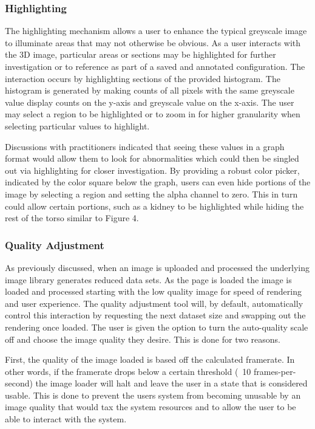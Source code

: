 \documentclass[annual]{acmsiggraph}
\begin{document}
\subsubsection{Highlighting}
	The highlighting mechanism allows a user to enhance the typical greyscale image to illuminate areas that may not otherwise be obvious.  As a user interacts with the 3D image, particular areas or sections may be highlighted for further investigation or to reference as part of a saved and annotated configuration.  The interaction occurs by highlighting sections of the provided histogram.  The histogram is generated by making counts of all pixels with the same greyscale value display counts on the y-axis and greyscale value on the x-axis.  The user may select a region to be highlighted or to zoom in for higher granularity when selecting particular values to highlight.  
	
	Discussions with practitioners indicated that seeing these values in a graph format would allow them to look for abnormalities which could then be singled out via highlighting for closer investigation.  By providing a robust color picker, indicated by the color square below the graph, users can even hide portions of the image by selecting a region and setting the alpha channel to zero.  This in turn could allow certain portions, such as a kidney to be highlighted while hiding the rest of the torso similar to Figure 4.
	
\subsubsection{Quality Adjustment}
	As previously discussed, when an image is uploaded and processed the underlying image library generates reduced data sets.  As the page is loaded the image is loaded and processed starting with the low quality image for speed of rendering and user experience.  The quality adjustment tool will, by default, automatically control this interaction by requesting the next dataset size and swapping out the rendering once loaded.  The user is given the option to turn the auto-quality scale off and choose the image quality they desire.  This is done for two reasons.  
	
	First, the quality of the image loaded is based off the calculated framerate.  In other words, if the framerate drops below a certain threshold (~10 frames-per-second) the image loader will halt and leave the user in a state that is considered usable.  This is done to prevent the users system from becoming unusable by an image quality that would tax the system resources and to allow the user to be able to interact with the system.
\end{document}
